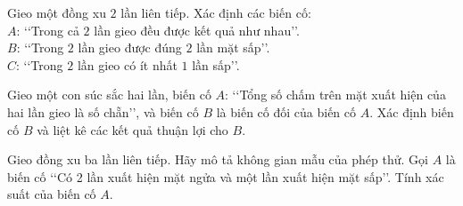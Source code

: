\begin{bt}%
	Gieo một đồng xu $2$ lần liên tiếp. Xác định các biến cố:\\
	\indent $A$: \lq\lq Trong cả $2$ lần gieo đều được kết quả như nhau\rq\rq.\\
	\indent $B$: \lq\lq Trong $2$ lần gieo được đúng $2$ lần mặt sấp\rq\rq.\\
	\indent $C$: \lq\lq Trong $2$ lần gieo có ít nhất $1$ lần sấp\rq\rq.
\end{bt}

\begin{bt}%
	Gieo một con súc sắc hai lần, biến cố $A$: \lq\lq Tổng số chấm trên mặt xuất hiện của hai lần gieo là số chẵn\rq\rq, và biến cố $B$ là biến cố đối của biến cố $A$. Xác định biến cố $B$ và liệt kê các kết quả thuận lợi cho $B$.
\end{bt}

\begin{bt}%
	Gieo đồng xu ba lần liên tiếp. Hãy mô tả không gian mẫu của phép thử. Gọi $A$ là biến cố \lq\lq Có 2 lần xuất hiện mặt ngửa và một lần xuất hiện mặt sấp\rq\rq. Tính xác suất của biến cố $A$.
\end{bt}


